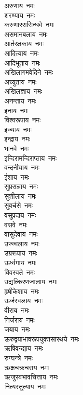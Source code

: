 \begin{multicols}{2}
    \begin{flushleft}
अरुणाय~नमः\\
शरण्याय~नमः\\
करुणारससिन्धवे~नमः\\
असमानबलाय~नमः\\
आर्तरक्षकाय~नमः\\
आदित्याय~नमः\\
आदिभूताय~नमः\\
अखिलागमवेदिने~नमः\\
अच्युताय~नमः\\
अखिलज्ञाय~नमः\hfill{}\\
अनन्ताय~नमः\\
इनाय~नमः\\
विश्वरूपाय~नमः\\
इज्याय~नमः\\
इन्द्राय~नमः\\
भानवे~नमः\\
इन्दिरामन्दिराप्ताय~नमः\\
वन्दनीयाय~नमः\\
ईशाय~नमः\\
सुप्रसन्नाय~नमः\hfill{}\\
सुशीलाय~नमः\\
सुवर्चसे~नमः\\
वसुप्रदाय~नमः\\
वसवे~नमः\\
वासुदेवाय~नमः\\
उज्ज्वलाय~नमः\\
उग्ररूपाय~नमः\\
ऊर्ध्वगाय~नमः\\
विवस्वते~नमः\\
उद्यत्किरणजालाय~नमः\hfill{}\\
हृषीकेशाय~नमः\\
ऊर्जस्वलाय~नमः\\
वीराय~नमः\\
निर्जराय~नमः\\
जयाय~नमः\\
ऊरुद्वयाभावरूपयुक्तसारथये~नमः\\
ऋषिवन्द्याय~नमः\\
रुग्घन्त्रे~नमः\\
ऋक्षचक्रचराय~नमः\\
ऋजुस्वभावचित्ताय~नमः\hfill{}\\
नित्यस्तुत्याय~नमः\\

\end{flushleft}
\end{multicols}
